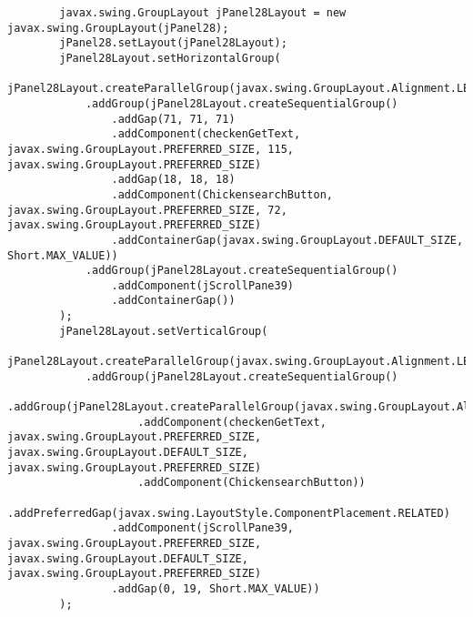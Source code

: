 \documentclass[12pt,a4paper]{article}
\begin{document}
\begin{lstlisting}
        javax.swing.GroupLayout jPanel28Layout = new javax.swing.GroupLayout(jPanel28);
        jPanel28.setLayout(jPanel28Layout);
        jPanel28Layout.setHorizontalGroup(
            jPanel28Layout.createParallelGroup(javax.swing.GroupLayout.Alignment.LEADING)
            .addGroup(jPanel28Layout.createSequentialGroup()
                .addGap(71, 71, 71)
                .addComponent(checkenGetText, javax.swing.GroupLayout.PREFERRED_SIZE, 115, javax.swing.GroupLayout.PREFERRED_SIZE)
                .addGap(18, 18, 18)
                .addComponent(ChickensearchButton, javax.swing.GroupLayout.PREFERRED_SIZE, 72, javax.swing.GroupLayout.PREFERRED_SIZE)
                .addContainerGap(javax.swing.GroupLayout.DEFAULT_SIZE, Short.MAX_VALUE))
            .addGroup(jPanel28Layout.createSequentialGroup()
                .addComponent(jScrollPane39)
                .addContainerGap())
        );
        jPanel28Layout.setVerticalGroup(
            jPanel28Layout.createParallelGroup(javax.swing.GroupLayout.Alignment.LEADING)
            .addGroup(jPanel28Layout.createSequentialGroup()
                .addGroup(jPanel28Layout.createParallelGroup(javax.swing.GroupLayout.Alignment.BASELINE)
                    .addComponent(checkenGetText, javax.swing.GroupLayout.PREFERRED_SIZE, javax.swing.GroupLayout.DEFAULT_SIZE, javax.swing.GroupLayout.PREFERRED_SIZE)
                    .addComponent(ChickensearchButton))
                .addPreferredGap(javax.swing.LayoutStyle.ComponentPlacement.RELATED)
                .addComponent(jScrollPane39, javax.swing.GroupLayout.PREFERRED_SIZE, javax.swing.GroupLayout.DEFAULT_SIZE, javax.swing.GroupLayout.PREFERRED_SIZE)
                .addGap(0, 19, Short.MAX_VALUE))
        );


\end{lstlisting}
\end{document}
